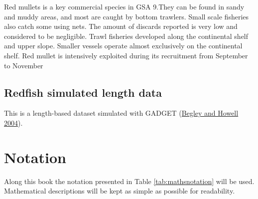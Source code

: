 \documentclass[
]{book}
\begin{document}
Red mullets is a key commercial species in GSA 9.They can be found in sandy and muddy areas, and most are caught by bottom trawlers. Small scale fisheries also catch some using nets. The amount of discards reported is very low and considered to be negligible. Trawl fisheries developed along the continental shelf and upper slope. Smaller vessels operate almost exclusively on the continental shelf. Red mullet is intensively exploited during its recruitment from September to November

\hypertarget{redfish-simulated-length-data}{%
\subsection{Redfish simulated length data}\label{redfish-simulated-length-data}}

This is a length-based dataset simulated with GADGET (\protect\hyperlink{ref-gadget}{Begley and Howell 2004}).

\hypertarget{notation}{%
\section{Notation}\label{notation}}

Along this book the notation presented in Table \ref{tab:mathsnotation} will be used. Mathematical descriptions will be kept as simple as possible for readability.
\end{document}
